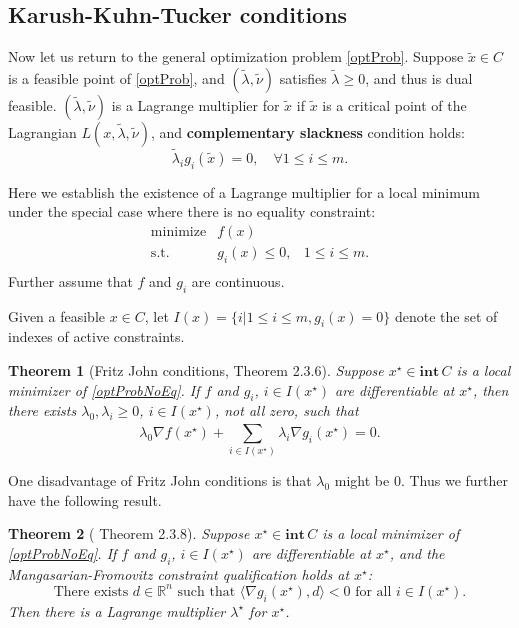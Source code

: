 \documentclass[openany]{book}
\newtheorem{theorem}{Theorem}[chapter]
\theoremstyle{definition}
\theoremstyle{remark}
\begin{document}
\subsection{Karush-Kuhn-Tucker conditions}
Now let us return to the general optimization problem \eqref{optProb}. Suppose $\tilde{x}\in C$ is a feasible point of \eqref{optProb}, and $(\tilde{\lambda},\tilde{\nu})$ satisfies $\tilde{\lambda}\ge0$, and thus is dual feasible. $(\tilde{\lambda},\tilde{\nu})$ is a Lagrange multiplier for $\tilde{x}$ if $\tilde{x}$ is a critical point of the Lagrangian $L(x,\tilde{\lambda},\tilde{\nu})$, and \textbf{complementary slackness} condition holds:
\begin{equation}\label{complSlack}
\tilde{\lambda}_ig_i(\tilde{x})=0,\quad\forall1\le i\le m.
\end{equation}

Here we establish the existence of a Lagrange multiplier for a local minimum under the special case where there is no equality constraint:
\begin{equation}\label{optProbNoEq}
    \begin{array}{lll}
    \mathrm{minimize} & f(x) & \\
    \mathrm{s.t.} & g_i(x)\le0, & 1\le i\le m. \\
    \end{array}
\end{equation}
Further assume that $f$ and $g_i$ are continuous.

Given a feasible $x\in C$, let $I(x)=\{i|1\le i\le m,g_i(x)=0\}$ denote the set of indexes of active constraints.
\begin{theorem}[Fritz John conditions, \cite{BL10} Theorem 2.3.6]
    Suppose $x^{\star}\in \mathbf{int}\,C$ is a local minimizer of \eqref{optProbNoEq}. If $f$ and $g_i$, $i\in I(x^{\star})$ are differentiable at $x^{\star}$, then there exists $\lambda_0,\lambda_i\ge0$, $i\in I(x^{\star})$, not all zero, such that
    \begin{equation}
        \lambda_0\nabla f(x^{\star})+\sum_{i\in I(x^{\star})}^{}\lambda_i\nabla g_i(x^{\star})=0.
    \end{equation}
\end{theorem}

One disadvantage of Fritz John conditions is that $\lambda_0$ might be $0$. Thus we further have the following result.
\begin{theorem}[\cite{BL10} Theorem 2.3.8]
    Suppose $x^{\star}\in \mathbf{int}\,C$ is a local minimizer of \eqref{optProbNoEq}. If $f$ and $g_i$, $i\in I(x^{\star})$ are differentiable at $x^{\star}$, and the Mangasarian-Fromovitz constraint qualification holds at $x^{\star}$:
    \begin{equation*}
        \textrm{There exists }d\in \mathbb{R}^n\textrm{ such that }\langle\nabla g_i(x^{\star}),d\rangle<0\textrm{ for all }i\in I(x^{\star}).
    \end{equation*}
    Then there is a Lagrange multiplier $\lambda^{\star}$ for $x^{\star}$.
\end{theorem}
\end{document}
